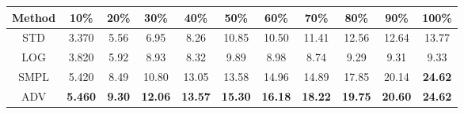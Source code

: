 \documentclass{standalone}
\begin{document}
\begin{tabular}{c|cccccccccc}
      \toprule
      Method & 10\% & 20\% & 30\% & 40\% & 50\% & 60\% & 70\% & 80\% & 90\% & 100\% \\
      \midrule
STD & 3.370 & 5.56 & 6.95 & 8.26 & 10.85 & 10.50 & 11.41 & 12.56 & 12.64 & 13.77\\
LOG & 3.820 & 5.92 & 8.93 & 8.32 & 9.89 & 8.98 & 8.74 & 9.29 & 9.31 & 9.33\\
SMPL & 5.420 & 8.49 & 10.80 & 13.05 & 13.58 & 14.96 & 14.89 & 17.85 & 20.14 & \textbf{24.62}\\
ADV & \textbf{5.460} & \textbf{9.30} & \textbf{12.06} & \textbf{13.57} & \textbf{15.30} & \textbf{16.18} & \textbf{18.22} & \textbf{19.75} & \textbf{20.60} & \textbf{24.62}\\
  \bottomrule
\end{tabular}
\end{document}

